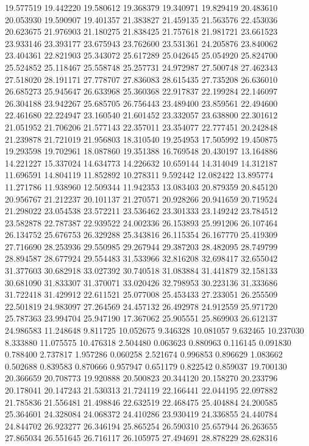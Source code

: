 19.577519
19.442220
19.580612
19.368379
19.340971
19.829419
20.483610
20.053930
19.590907
19.401357
21.383827
21.459135
21.563576
22.453036
20.623675
21.976903
21.180275
21.838425
21.757618
21.981721
23.661523
23.933146
23.393177
23.675943
23.762600
23.531361
24.205876
23.840062
23.404361
22.821903
25.343072
25.617289
25.042645
25.054920
25.824700
25.524852
25.118467
25.558748
25.257731
24.972987
27.500748
27.462343
27.518020
28.191171
27.778707
27.836083
28.615435
27.735208
26.636010
26.685273
25.945647
26.633968
25.360368
22.917837
22.199284
22.146097
26.304188
23.942267
25.685705
26.756443
23.489400
23.859561
22.494600
22.461680
22.224947
23.160540
21.601452
23.332057
23.638800
22.301612
21.051952
21.706206
21.577143
22.357011
23.354077
22.777451
20.242848
21.239878
21.721019
21.956803
18.310540
19.254953
17.505992
19.450875
19.293598
19.702961
18.087860
19.351388
16.769548
20.430197
13.164886
14.221227
15.337024
14.634773
14.226632
10.659144
14.314049
14.312187
11.696591
14.804119
11.852892
10.278311
9.592442
12.082422
13.895774
11.271786
11.938960
12.509344
11.942353
13.083403
20.879359
20.845120
20.956767
21.212237
20.101137
21.270571
20.928266
20.941659
20.719524
21.298022
23.054538
23.572211
23.536462
23.301333
23.149242
23.784512
23.582878
22.787387
22.939522
24.002336
26.153893
25.991206
26.107464
26.134752
25.676753
26.329288
25.343816
26.115354
26.167770
25.419309
27.716690
28.253936
29.550985
29.267944
29.387203
28.482095
28.749799
28.894587
28.677924
29.554483
31.533966
32.816208
32.698417
32.655042
31.377603
30.682918
33.027392
30.740518
31.083884
31.441879
32.158133
30.681090
31.833307
31.370071
33.020426
32.798953
30.223136
31.333686
31.722418
31.429912
22.611521
25.077008
25.453433
27.233051
26.255509
22.501819
24.983097
27.264569
24.457132
26.492978
24.912559
25.971720
25.787363
23.994704
25.947190
17.367062
25.905551
25.869903
26.612137
24.986583
11.248648
9.811725
10.052675
9.346328
10.081057
9.632465
10.237030
8.333880
11.075575
10.476318
2.504480
0.063623
0.880963
0.116145
0.091830
0.788400
2.737817
1.957286
0.060258
2.521674
0.996853
0.896629
1.083662
0.502688
0.839583
0.870666
0.957947
0.651179
0.822542
0.859037
19.700130
20.366659
20.708773
19.920888
20.500823
20.344120
20.158270
20.233796
20.178041
20.147243
21.530313
21.724119
22.166441
22.044195
22.097882
21.785836
21.556481
21.498846
22.632519
22.468475
25.404884
24.200585
25.364601
24.328084
24.068372
24.410286
23.930419
24.336855
24.440784
24.844702
26.923277
26.346194
25.865254
26.590310
25.657944
26.263655
27.865034
26.551645
26.716117
26.105975
27.494691
28.878229
28.628316
